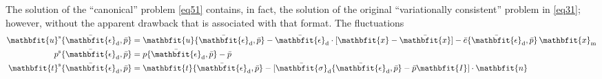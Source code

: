 \documentclass[12pt,a4paper]{article}
\renewcommand{\ta}[1]{\mathbfit{#1}}
\renewcommand{\ts}[1]{\mathbfit{#1}}
\renewcommand{\diff}{\mathbfup{\nabla}}
\renewcommand{\Box}{\mdlgwhtsquare}
\DeclarePairedDelimiter{\homgen}{\langle}{\rangle_\rve}
\renewcommand{\dev}{\mathrm{d}}
\renewcommand{\vol}{\mathrm{v}}
\newcommand{\rve}{
  {\mathchoice
   {\mbox{\scalebox{0.67}{$\Box$}}}
   {\mbox{\scalebox{0.67}{$\Box$}}}
   {\mbox{\scalebox{0.5}{$\Box$}}}
   {\mbox{\scalebox{0.375}{$\Box$}}}
  }
}
\begin{document}
%
The solution of the ``canonical'' problem \cref{eq51} contains, in fact, the solution of the original ``variationally consistent'' problem in \cref{eq31}; however, without the apparent drawback that is associated with that format.
The fluctuations
\begin{subequations}
\begin{align}
    \ta u^\fluct\{\bar{\ts\epsilon}_\dev, \bar{p}\} &= \ta u\{\bar{\ts\epsilon}_\dev, \bar{p}\} - \bar{\ts\epsilon}_\dev \cdot[\ta x - \bar{\ta x}] - \bar{e}\{\bar{\ts\epsilon}_\dev, \bar{p}\}\,\ta x_\mean
\label{eq52a} \\
    p^\fluct\{\bar{\ts\epsilon}_\dev, \bar{p}\} &= p\{\bar{\ts\epsilon}_\dev, \bar{p}\} - \bar{p}
\label{eq52b} \\
    \ta t^\fluct\{\bar{\ts\epsilon}_\dev, \bar{p}\} &= \ta t\{\bar{\ts\epsilon}_\dev, \bar{p}\} - [\bar{\ts\sigma}_\dev\{\bar{\ts\epsilon}_\dev, \bar{p}\} - \bar{p}\ts I]\cdot \ta n
\label{eq52c}
\end{align}
\end{subequations}
\end{document}
